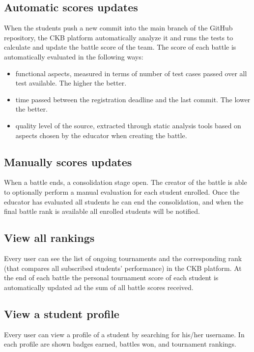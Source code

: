 \subsection{Automatic scores updates}
When the students push a new commit into the main branch of the GitHub repository, the CKB platform automatically analyze it and runs the tests to calculate and update the battle score of the team.\newline
The score of each battle is automatically evaluated in the following ways:
\begin{itemize}
        \item functional aspects, measured in terms of number of test cases passed over all test available. The higher the better.
        \item time passed between the registration deadline and the last commit. The lower the better.
        \item quality level of the source, extracted through static analysis tools based on aspects chosen by the educator when creating the battle. 
\end{itemize}

\subsection{Manually scores updates}
When a battle ends, a consolidation stage open. The creator of the battle is able to optionally perform a manual evaluation for each student enrolled.
Once the educator has evaluated all students he can end the consolidation, and when the final battle rank is available all enrolled students will be notified.

\subsection{View all rankings}
Every user can see the list of ongoing tournaments and the corresponding rank (that compares all subscribed students' performance) in the CKB platform.
At the end of each battle the personal tournament score of each student is automatically updated ad the sum of all battle scores received. 

\subsection{View a student profile}
Every user can view a profile of a student by searching for his/her username. In each profile are shown badges earned, battles won, and tournament rankings. 

